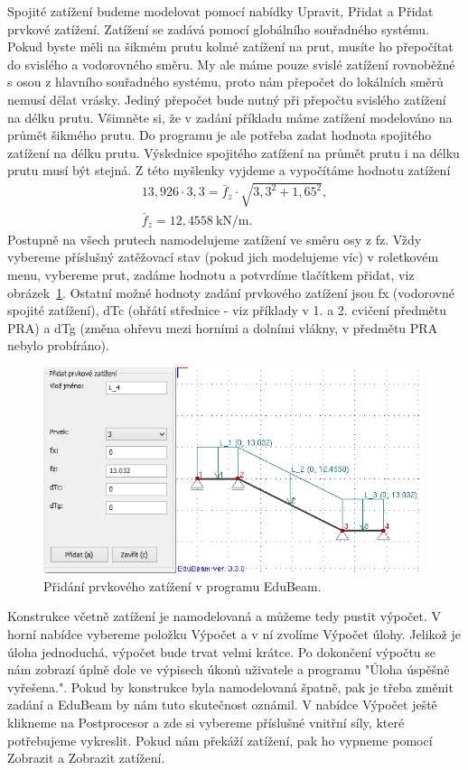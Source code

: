 \documentclass[12pt,fleqn]{article}
\begin{document}
Spojité zatížení budeme modelovat pomocí nabídky Upravit, Přidat a Přidat prvkové zatížení. Zatížení se zadává pomocí globálního souřadného systému. Pokud byste měli na šikmém prutu kolmé zatížení na prut, musíte ho přepočítat do svislého a vodorovného směru. My ale máme pouze svislé zatížení rovnoběžné s osou z hlavního souřadného systému, proto nám přepočet do lokálních směrů nemusí dělat vrásky. Jediný přepočet bude nutný při přepočtu svislého zatížení na délku prutu. Všimněte si, že v zadání příkladu máme zatížení modelováno na průmět šikmého prutu. Do programu je ale potřeba zadat hodnota spojitého zatížení na délku prutu. Výslednice spojitého zatížení na průmět prutu i na délku prutu musí být stejná. Z této myšlenky vyjdeme a vypočítáme hodnotu zatížení
\begin{eqnarray*}
13,926 \cdot 3,3 = \bar{f}_z \cdot \sqrt{3,3^2 + 1,65^2}, \\
\bar{f}_z = 12,4558 \ \textrm{kN/m}.
\end{eqnarray*}
Postupně na všech prutech namodelujeme zatížení ve směru osy z fz. Vždy vybereme příslušný zatěžovací stav (pokud jich modelujeme víc) v roletkovém menu, vybereme prut, zadáme hodnotu a potvrdíme tlačítkem přidat, viz obrázek~\ref{fig:EduBeam_zatizeni}. Ostatní možné hodnoty zadání prvkového zatížení jsou fx (vodorovné spojité zatížení), dTc (ohřátí střednice - viz příklady v 1. a 2. cvičení předmětu PRA) a dTg (změna ohřevu mezi horními a dolními vlákny, v předmětu PRA nebylo probíráno).

\begin{figure}[ht]
\centering
\includegraphics[width=0.99\textwidth]{figs/eduBeam_zatizeni.png}\caption{Přidání prvkového zatížení v programu EduBeam.}\label{fig:EduBeam_zatizeni}
\end{figure}

Konstrukce včetně zatížení je namodelovaná a můžeme tedy pustit výpočet. V horní nabídce vybereme položku Výpočet a v ní zvolíme Výpočet úlohy. Jelikož je úloha jednoduchá, výpočet bude trvat velmi krátce. Po dokončení výpočtu se nám zobrazí úplně dole ve výpisech úkonů uživatele a programu "Úloha úspěšně vyřešena.". Pokud by konstrukce byla namodelovaná špatně, pak je třeba změnit zadání a EduBeam by nám tuto skutečnost oznámil. V nabídce Výpočet ještě klikneme na Postprocesor a zde si vybereme příslušné vnitřní síly, které potřebujeme vykreslit. Pokud nám překáží zatížení, pak ho vypneme pomocí Zobrazit a Zobrazit zatížení.
\end{document}
